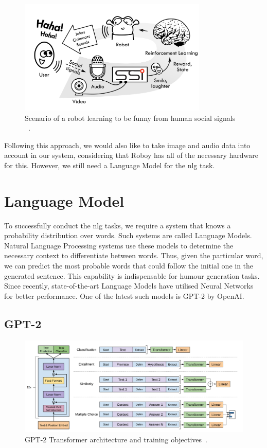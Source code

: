 \begin{figure}[htpb]
  \centering
  \includegraphics[width=0.8\textwidth]{figures/humour.png}
  \caption{Scenario of a robot learning to be funny from human social signals ~\parencite{10.1145/3242969.3242976}. } \label{fig:humour}
\end{figure}

Following this approach, we would also like to take image and audio data into account in our system, considering that Roboy has all of the necessary hardware for this. However, we still need a Language Model for the \acrshort{nlg} task. 

\section{Language Model}
To successfully conduct the \acrshort{nlg} tasks, we require a system that knows a probability distribution over words. Such systems are called Language Models. Natural Language Processing systems use these models to determine the necessary context to differentiate between words. Thus, given the particular word, we can predict the most probable words that could follow the initial one in the generated sentence. This capability is indispensable for humour generation tasks. Since recently, state-of-the-art Language Models have utilised Neural Networks for better performance. One of the latest such models is GPT-2 by OpenAI.

\subsection{GPT-2}

\begin{figure}[htpb]
  \centering
  \includegraphics[width=1.0\textwidth]{figures/gpt.png}
  \caption{GPT-2 Transformer architecture and training objectives~\parencite{Radford2018ImprovingLU}.} \label{fig:gpt}
\end{figure}

